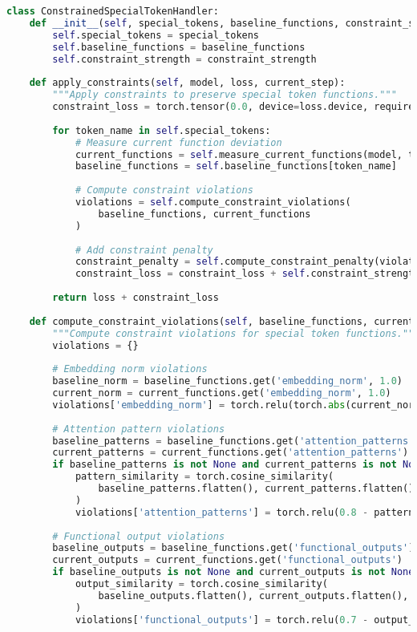 \begin{lstlisting}[language=Python, caption=Function-preserving fine-tuning framework]
class ConstrainedSpecialTokenHandler:
    def __init__(self, special_tokens, baseline_functions, constraint_strength):
        self.special_tokens = special_tokens
        self.baseline_functions = baseline_functions
        self.constraint_strength = constraint_strength
        
    def apply_constraints(self, model, loss, current_step):
        """Apply constraints to preserve special token functions."""
        constraint_loss = torch.tensor(0.0, device=loss.device, requires_grad=True)
        
        for token_name in self.special_tokens:
            # Measure current function deviation
            current_functions = self.measure_current_functions(model, token_name)
            baseline_functions = self.baseline_functions[token_name]
            
            # Compute constraint violations
            violations = self.compute_constraint_violations(
                baseline_functions, current_functions
            )
            
            # Add constraint penalty
            constraint_penalty = self.compute_constraint_penalty(violations)
            constraint_loss = constraint_loss + self.constraint_strength * constraint_penalty
        
        return loss + constraint_loss
    
    def compute_constraint_violations(self, baseline_functions, current_functions):
        """Compute constraint violations for special token functions."""
        violations = {}
        
        # Embedding norm violations
        baseline_norm = baseline_functions.get('embedding_norm', 1.0)
        current_norm = current_functions.get('embedding_norm', 1.0)
        violations['embedding_norm'] = torch.relu(torch.abs(current_norm - baseline_norm) - 0.1)
        
        # Attention pattern violations
        baseline_patterns = baseline_functions.get('attention_patterns')
        current_patterns = current_functions.get('attention_patterns')
        if baseline_patterns is not None and current_patterns is not None:
            pattern_similarity = torch.cosine_similarity(
                baseline_patterns.flatten(), current_patterns.flatten(), dim=0
            )
            violations['attention_patterns'] = torch.relu(0.8 - pattern_similarity)
        
        # Functional output violations
        baseline_outputs = baseline_functions.get('functional_outputs')
        current_outputs = current_functions.get('functional_outputs')
        if baseline_outputs is not None and current_outputs is not None:
            output_similarity = torch.cosine_similarity(
                baseline_outputs.flatten(), current_outputs.flatten(), dim=0
            )
            violations['functional_outputs'] = torch.relu(0.7 - output_similarity)
        

\end{lstlisting}

